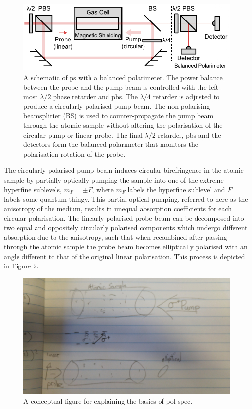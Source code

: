 \begin{figure}
\centering
\includegraphics[width=\linewidth]{chapter1/Figs/PolSpecSchematic.pdf}
\caption{A schematic of \gls{ps} with a balanced polarimeter.
The power balance between the probe and the pump beam is controlled with the left-most $\lambda/2$ phase retarder and \gls{pbs}.
The $\lambda/4$ retarder is adjusted to produce a circularly polarised pump beam.
The non-polarising beamsplitter (BS) is used to counter-propagate the pump beam through the atomic sample without altering the polarisation of the circular pump or linear probe.
The final $\lambda/2$ retarder, \gls{pbs} and the detectors form the balanced polarimeter that monitors the polarisation rotation of the probe.}
\label{figure:pol_spec_schematic}
\end{figure}

The circularly polarised pump beam induces circular birefringence in the atomic sample by partially optically pumping the sample into one of the extreme hyperfine sublevels, $m_F=\pm F$, where $m_F$ labels the hyperfine sublevel and $F$ labels {\color{red}some quantum thingy.}
This partial optical pumping, referred to here as the anisotropy of the medium, results in unequal absorption coefficients for each circular polarisation.
The linearly polarised probe beam can be decomposed into two equal and oppositely circularly polarised components which undergo different absorption due to the anisotropy, such that when recombined after passing through the atomic sample the probe beam becomes elliptically polarised with an angle different to that of the original linear polarisation.
This process is depicted in Figure \ref{figure:pol_spec_explanation}.

\begin{figure}
\centering
\includegraphics[width=\linewidth,angle=180]{chapter1/Figs/pol_spec_explanation_placeholder.jpg}
\caption{A conceptual figure for explaining the basics of pol spec.}
\label{figure:pol_spec_explanation}
\end{figure}


